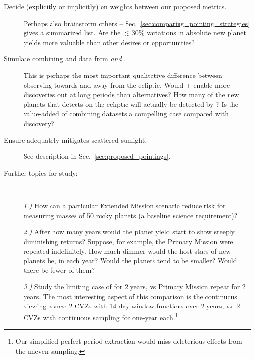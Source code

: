 \begin{description}
	\item[Decide (explicitly or implicitly) on weights between our
          proposed metrics.]  Perhaps also brainstorm others --
          Sec.~\ref{sec:comparing_pointing_strategies} gives a
          summarized list.  Are the $\lesssim30\%$ variations in
          absolute new planet yields more valuable than other desires
          or opportunities?
	
	\item[Simulate combining \tess and \ktwo data from
          \rm{\elong\:} \textit{and} \rm{\eshort}.]  This is perhaps
          the most important qualitative difference between observing
          towards and away from the ecliptic.  Would \tess\!+\ktwo
          enable more discoveries out at long periods than
          alternatives?  How many of the new planets that \tess
          detects on the ecliptic will actually be detected by \ktwo?
          Is the value-added of combining datasets a compelling case
          compared with discovery?
          
    \item[Ensure {\rm \npole} adequately mitigates scattered sunlight.]
    See description in Sec.~\ref{sec:proposed_pointings}.
	
	\item[Further topics for study:]
	\ 
	
	\textit{1.)}
	How can a particular Extended Mission scenario reduce risk for measuring 
	masses of 50 rocky planets (a baseline \tess science requirement)?
	
	\textit{2.)}
	After how many years would the planet yield start to show steeply diminishing returns?
	Suppose, for example, the Primary Mission were repeated indefinitely.
  How much dimmer would the host stars of new planets be, in each year?
	Would the planets tend to be smaller?
	Would there be fewer of them?
	
	\textit{3.)}
	Study the limiting case of \hemis\:for 2 years, vs Primary Mission repeat 
	for 2 years. The most interesting aspect of this comparison is the 
	continuous viewing zones: 2 CVZs with 14-day window functions over 2 years, 
	vs. 2 CVZs with continuous sampling for one-year each.\footnote{Our 
	simplified perfect period extraction would miss deleterious effects from the 
	uneven sampling.}
\end{description}
